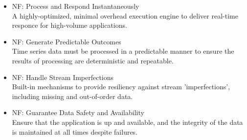 \begin{itemize}
\item{NF: Process and Respond Instantaneously\\ A highly-optimized, minimal overhead execution engine to deliver real-time responce for 
high-volume applications. }
\item{NF: Generate Predictable Outcomes\\ Time series data must be processed in a predictable manner to ensure the results of processing 
are deterministic and repeatable.} 
\item{NF: Handle Stream Imperfections\\ Built-in mechanisms to provide resiliency against stream 'imperfections', including missing and
out-of-order data.}
\item{NF: Guarantee Data Safety and Availability\\ Ensure that the application is up and available, and the integrity of the data is maintained 
at all times despite failures. }
\end{itemize}
